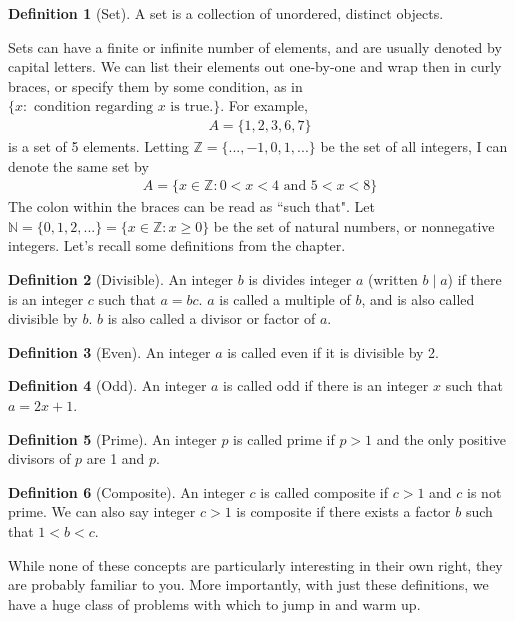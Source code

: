 \documentclass[11pt]{article}
\newcommand{\N}{\ensuremath{\mathbb N}}
\newcommand{\Z}{\ensuremath{\mathbb Z}}
\theoremstyle{plain}
\theoremstyle{definition}
\newtheorem{defi}{Definition}[section]
\theoremstyle{remark}
\begin{document}
\begin{defi}[Set]
    A set is a collection of unordered, distinct objects. 
\end{defi}
Sets can have a finite or infinite number of elements, and are usually denoted by capital letters. We can list their elements out one-by-one and wrap then in curly braces, or specify them by some condition, as in $\{x : \text{ condition regarding $x$ is true.}\}$. For example, 
\begin{align*}
    A = \{1, 2, 3, 6, 7\}
\end{align*}
is a set of 5 elements. Letting $\Z = \{..., -1, 0, 1, ...\}$ be the set of all integers, I can denote the same set by
\begin{align*}
    A = \{x \in \Z: 0 < x < 4 \text{ and } 5 < x < 8\}
\end{align*}
The colon within the braces can be read as ``such that". Let $\N = \{0, 1, 2, ...\} = \{x \in \Z: x \geq 0\}$ be the set of natural numbers, or nonnegative integers. Let's recall some definitions from the chapter.
\begin{defi}[Divisible]
    An integer $b$ is divides integer $a$ (written $b \mid a$) if there is an integer $c$ such that $a = bc$. $a$ is called a multiple of $b$, and is also called divisible by $b$. $b$ is also called a divisor or factor of $a$. 
\end{defi}
\begin{defi}[Even]
    An integer $a$ is called even if it is divisible by 2.
\end{defi}
\begin{defi}[Odd]
    An integer $a$ is called odd if there is an integer $x$ such that $a = 2x + 1$.
\end{defi}
\begin{defi}[Prime]
    An integer $p$ is called prime if $p > 1$ and the only positive divisors of $p$ are 1 and $p$.
\end{defi}
\begin{defi}[Composite]
    An integer $c$ is called composite if $c > 1$ and $c$ is not prime. We can also say integer $c > 1$ is composite if there exists a factor $b$ such that $1 < b < c$.
\end{defi}

While none of these concepts are particularly interesting in their own right, they are probably familiar to you. More importantly, with just these definitions, we have a huge class of problems with which to jump in and warm up. 
\end{document}
